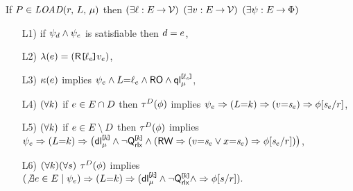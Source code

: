 \noindent
If $\aPS \in \sLOAD[\amode]{\aReg}{\cExp}$ then
$(\exists\cVal:\aEvs\fun\Val)$
$(\exists\aVal:\aEvs\fun\Val)$
$(\exists\bForm:\aEvs\fun\Formulae)$
\begin{enumerate}
\item[L1)] if $\bForm_\bEv\land\bForm_\aEv$ is satisfiable then $\bEv=\aEv$,
\item[L2)] $\labelingAct(\aEv) = \DRREFP{\cVal_\aEv}{\aVal_\aEv}$,
\item[L3)] $\labelingForm(\aEv)$ implies
  \begin{math}
    \bForm_\aEv
    \land \cExp{=}\cVal_\aEv
    \land \RO
    \land \QL{\REF{\cVal_\aEv}}{\amode}
  \end{math},
\item[L4)]
  \begin{math}
    (\forall\dVal)
  \end{math}
  if $\aEv\in\aEvs\cap\bEvs$ then
  $\aTr[\bEvs](\aForm)$ implies
  \begin{math}
    \bForm_\aEv
    \limplies (\cExp{=}\dVal)
    \limplies (\aVal{=}\uReg{\aEv})
    \limplies \aForm[\uReg{\aEv}/\aReg]%
  \end{math},
  \makebox[4.8cm]{}
\item[L5)] 
  \begin{math}
    (\forall\dVal)
  \end{math}
  if $\aEv\in\aEvs\setminus\bEvs$ then
  $\aTr[\bEvs](\aForm)$ implies
  \begin{math}
    \bForm_\aEv
    \limplies (\cExp{=}\dVal)
    \limplies \PBRbig{        
      \DL{\REF{\dVal}}{\amode}
      \land \lnot\QxREF{\dVal}
      \land
      (\RW
      \limplies (\aVal{=}\uReg{\aEv}\lor\aLoc{=}\uReg{\aEv}) 
      \limplies \aForm[\uReg{\aEv}/\aReg]%
      )
    }      
  \end{math},
\item[L6)] %
  \begin{math}
    (\forall\dVal)
    (\forall\bReg)
  \end{math}
  $\aTr[\bEvs](\aForm)$ implies 
  \begin{math}
    (\not\exists\aEv\in\aEvs \suchthat \bForm_\aEv)
    \limplies (\cExp{=}\dVal)
    \limplies \PBR{        
      \DL{\REF{\dVal}}{\amode}
      \land \lnot\QxREF{\dVal}
      \land
      \limplies \aForm[\bReg/\aReg]%
    }.
  \end{math}
\end{enumerate}  
